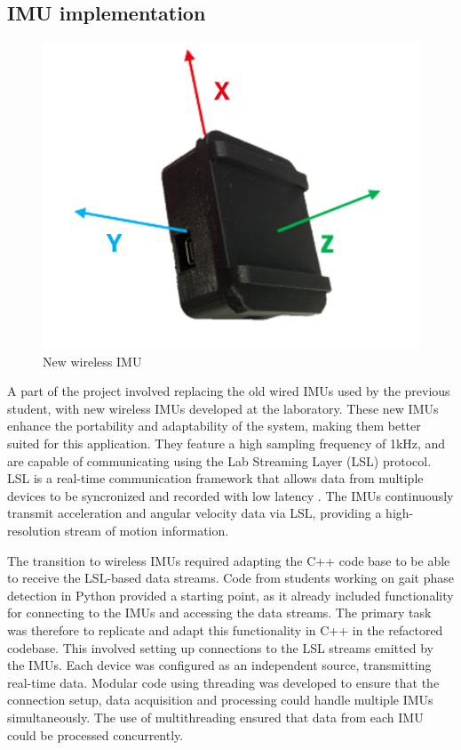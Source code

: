\subsection{IMU implementation}
\begin{figure}
        \centering
    \includegraphics[width=\linewidth]{images/IMU_directions.png}
    \caption{New wireless IMU}
    \label{fig:imudirection}
\end{figure}
A part of the project involved replacing the old wired IMUs used by the previous student, with new wireless IMUs developed at the laboratory. These new IMUs enhance the portability and adaptability of the system, making them better suited for this application. They feature a high sampling frequency of 1kHz, and are capable of communicating using the Lab Streaming Layer (LSL) protocol. LSL is a real-time communication framework that allows data from multiple devices to be syncronized and recorded with low latency \cite{noauthor_lsl-website_nodate}. The IMUs continuously transmit acceleration and angular velocity data via LSL, providing a high-resolution stream of motion information.

The transition to wireless IMUs required adapting the C++ code base to be able to receive the LSL-based data streams. Code from students working on gait phase detection in Python provided a starting point, as it already included functionality for connecting to the IMUs and accessing the data streams. The primary task was therefore to replicate and adapt this functionality in C++ in the refactored codebase. This involved setting up connections to the LSL streams emitted by the IMUs. Each device was configured as an independent source, transmitting real-time data. Modular code using threading was developed to ensure that the connection setup, data acquisition and processing could handle multiple IMUs simultaneously. The use of multithreading ensured that data from each IMU could be processed concurrently. 

